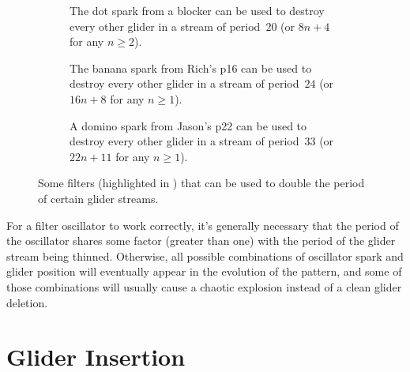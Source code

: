 \begin{figure}[!htb]
	\centering
	\begin{subfigure}{.31\textwidth}
		\centering
		\caption{The dot spark from a blocker can be used to destroy every other glider in a stream of period~$20$ (or $8n+4$ for any $n \geq 2$).}
		\label{fig:blocker_glider_filter}
	\end{subfigure} \hfill %
	\begin{subfigure}{.31\textwidth}
		\centering
		\caption{The banana spark from Rich's p16 can be used to destroy every other glider in a stream of period~$24$ (or $16n+8$ for any $n \geq 1$).}
		\label{fig:richs_p16_glider_filter}
	\end{subfigure} \hfill %
	\begin{subfigure}{.31\textwidth}
		\centering
		\caption{A domino spark from Jason's p22 can be used to destroy every other glider in a stream of period~$33$ (or $22n+11$ for any $n \geq 1$).}
		\label{fig:p22_glider_filter}
	\end{subfigure}
	\caption{Some filters (highlighted in ) that can be used to double the period of certain glider streams.}\label{fig:glider_filters}
\end{figure}

For a filter oscillator to work correctly, it's generally necessary that the period of the oscillator shares some factor (greater than one) with the period of the glider stream being thinned. Otherwise, all possible combinations of oscillator spark and glider position will eventually appear in the evolution of the pattern, and some of those combinations will usually cause a chaotic explosion instead of a clean glider deletion.



\section{Glider Insertion}\label{sec:glider_insertion}

